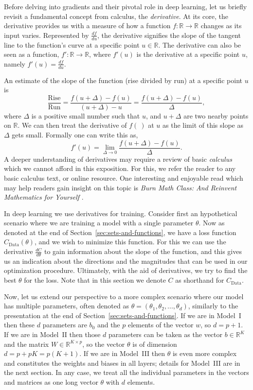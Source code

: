 \documentclass[12pt]{article}
\begin{document}
Before delving into gradients and their pivotal role in deep learning, let us briefly revisit a fundamental concept from calculus, the {\em derivative}. At its core, the derivative provides us with a measure of how a function $f: {\mathbb R} \to {\mathbb R}$ changes as its input varies. Represented by \( \frac{df}{du} \), the derivative signifies the slope of the tangent line to the function's curve at a specific point $u \in {\mathbb R}$. The derivative can also be seen as a function, $f':{\mathbb R} \to {\mathbb R}$, where $f'(u)$ is the derivative at a specific point $u$, namely $f'(u) = \frac{df}{du}$.  

An estimate of the slope of the function (rise divided by run) at a specific point $u$ is
%
\[
\frac{\textrm{Rise}}{\textrm{Run}} = \frac{f(u+\Delta) - f(u)}{(u+\Delta) - u} = \frac{f(u+\Delta) - f(u)}{\Delta},  
\]
%
where $\Delta$ is a positive small number such that $u$, and $u + \Delta$ are two nearby points on ${\mathbb R
}$. We can then treat the derivative of $f(~)$ at $u$ as the limit of this slope as $\Delta$ gets small. Formally one can write this as,
%
\[
f'(u) = \lim_{\Delta \to 0} \frac{f(u+\Delta) - f(u)}{\Delta}.
\]
%
A deeper understanding of derivatives may require a review of basic {\em calculus} which we cannot afford in this exposition. For this, we refer the reader to any basic calculus text, or online resource. One interesting and enjoyable read which may help readers gain insight on this topic is {\em Burn Math Class: And Reinvent Mathematics for Yourself} \cite{wilkes2016burn}.

In deep learning we use derivatives for training. Consider first an hypothetical scenario where we are training a model with a single parameter $\theta$. Now as denoted at the end of Section~\ref{sec:sets-and-functions}, we have a loss function $C_{\textrm{Data}}(\theta)$, and we wish to minimize this function. For this we can use the derivative $\frac{dC}{d\theta}$ to gain information about the slope of the function, and this gives us an indication about the directions and the magnitudes that can be used in our optimization procedure. Ultimately, with the aid of derivatives, we try to find the best $\theta$ for the loss. Note that in this section we denote $C$ as shorthand for $C_{\textrm{Data}}$.

Now, let us extend our perspective to a more complex scenario where our model has multiple parameters, often denoted as $\theta = (\theta_1, \theta_2, ..., \theta_d)$, similarly to the presentation at the end of Section~\ref{sec:sets-and-functions}. If we are in Model~I then these $d$ parameters are $b_0$ and the $p$ elements of the vector $w$, so $d=p+1$. If we are in Model~II then those $d$ parameters can be taken as the vector $b \in {\mathbb R}^K$ and the matrix $W \in {\mathbb R}^{K\times p}$, so the vector $\theta$ is of dimension $d = p + pK = p(K+1)$. If we are in Model~III then $\theta$ is even more complex and constitutes the weights and biases in all layers; details for Model~III are in the next section. In any case, we treat all the individual parameters in the vectors and matrices as one long vector $\theta$ with $d$ elements.  
\end{document}
